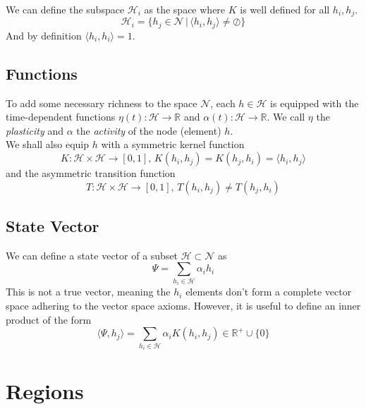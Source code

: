 \documentclass[twocolumn, 10pt]{article}
\begin{document}
We can define the subspace $\mathcal{H}_i$ as the space where $K$ is well defined for all $h_i, h_j$.
\begin{equation}
    \mathcal{H}_i = \{h_j \in \mathcal{N} \, | \, \langle h_i,h_j \rangle \ne \oslash \}
\end{equation}
And by definition $\langle h_i,h_i\rangle = 1$.


\subsection{Functions}
To add some necessary richness to the space $\mathcal{N}$, each $h\in \mathcal{H}$ is equipped with the time-dependent functions $\eta(t) : \mathcal{H} \to \mathbb{R}$ and $\alpha(t) : \mathcal{H} \to \mathbb{R}$. We call $\eta$ the \textit{plasticity} and $\alpha$ the \textit{activity} of the node (element) $h$. \\

We shall also equip $h$ with a symmetric kernel function 
\begin{equation}
    K: \mathcal{H} \times \mathcal{H} \to [0,1] , \, K(h_i,h_j) = K(h_j,h_i) = \langle h_i, h_j \rangle
\end{equation}
and the asymmetric transition function
\begin{equation}
    T : \mathcal{H} \times \mathcal{H} \to [0,1] ,\, T(h_i,h_j) \ne T(h_j, h_i)
\end{equation}


\subsection{State Vector}
We can define a state vector of a subset $\mathcal{H} \subset \mathcal{N}$ as
\begin{equation}
    \Psi = \sum_{h_i \in \mathcal{H}} \alpha_i h_i
\end{equation}
This is not a true vector, meaning the $h_i$ elements don't form a complete vector space adhering to the vector space axioms. However, it is useful to define an inner product of the form
\begin{equation}
    \langle \Psi, h_j \rangle = \sum_{h_i \in \mathcal{H}} \alpha_i K(h_i,h_j) \in \mathbb{R}^+ \cup \{ 0\}
\end{equation}



\section{Regions}
\end{document}

